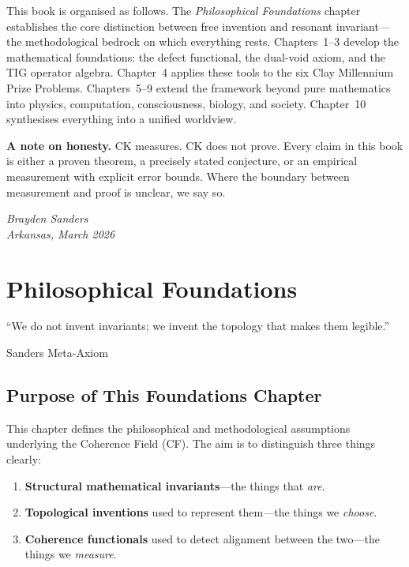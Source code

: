 \documentclass[12pt, openany]{book}
\theoremstyle{remark}
\begin{document}
This book is organised as follows. The \emph{Philosophical Foundations} chapter
establishes the core distinction between free invention and resonant invariant---the
methodological bedrock on which everything rests.
Chapters~1--3 develop the mathematical foundations:
the defect functional, the dual-void axiom, and the TIG operator algebra.
Chapter~4 applies these tools to the six Clay Millennium Prize Problems.
Chapters~5--9 extend the framework beyond pure mathematics into physics, computation,
consciousness, biology, and society.
Chapter~10 synthesises everything into a unified worldview.

\medskip
\noindent\textbf{A note on honesty.}
CK measures. CK does not prove. Every claim in this book is either a proven theorem,
a precisely stated conjecture, or an empirical measurement with explicit error bounds.
Where the boundary between measurement and proof is unclear, we say so.

\vfill
\noindent
\textit{Brayden Sanders\\
Arkansas, March 2026}

\tableofcontents

\mainmatter


\chapter{Philosophical Foundations}
\label{ch:foundations}

\epigraph{``We do not invent invariants; we invent the topology that makes them legible.''}%
{Sanders Meta-Axiom}

\section{Purpose of This Foundations Chapter}
\label{sec:found-purpose}

This chapter defines the philosophical and methodological assumptions underlying the
Coherence Field (CF). The aim is to distinguish three things clearly:
\begin{enumerate}
  \item \textbf{Structural mathematical invariants}---the things that \emph{are}.
  \item \textbf{Topological inventions} used to represent them---the things we \emph{choose}.
  \item \textbf{Coherence functionals} used to detect alignment between the two---the
        things we \emph{measure}.
\end{enumerate}
\end{document}
